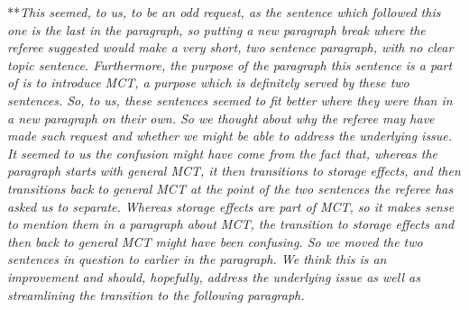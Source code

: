 \documentclass[letterpaper,11pt]{article}
\begin{document}
\noindent ***\emph{This seemed, to us, to be an odd request, as the sentence which followed this one is the 
last in the paragraph, so putting a new paragraph break where the referee suggested would make a very short, two
sentence paragraph, with no clear topic sentence. Furthermore, the purpose of the paragraph this sentence
is a part of is to introduce MCT, a purpose which is definitely served by these two sentences. So, to us,
these sentences seemed to fit better where they were than in a new paragraph on their own. 
So we thought about why the referee may have made such
request and whether we might be able to address the underlying issue. It seemed to us the confusion might have come
from the fact that, whereas the paragraph starts with general MCT, it then transitions to storage effects, and 
then transitions back
to general MCT at the point of the two sentences the referee has asked us to separate. 
Whereas storage effects are part of MCT, so it makes sense to mention them in a paragraph about MCT,
the transition to storage effects and then back to general MCT might have been confusing. So we moved the
two sentences in question to earlier in the paragraph. We think this is an improvement and should, hopefully,
address the underlying issue as well as streamlining the transition to the following paragraph.} 
\end{document}
